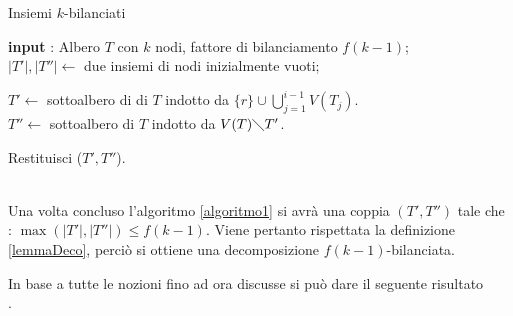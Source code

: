 \begin{algorithm}[H]
	\label{algoritmo1}
	\SetAlgoLined
	\caption{Insiemi $ k $-bilanciati}
	\textbf{input} : Albero $ T $ con $ k $ nodi, fattore di bilanciamento $ f(k-1) $;\\
	$ |T'| , |T''|\longleftarrow $ due insiemi di nodi inizialmente vuoti;\\ 	
	{
		{
			$ T'\longleftarrow $ sottoalbero di  di $ T $ indotto da $ \{r\} \cup \bigcup_{j=1}^{i-1}V(T_j)$.\\
			$ T''\longleftarrow $ sottoalbero di $ T $ indotto da $ V(T) \diagdown T'$.
		}
		 
}
	Restituisci ($ T',T'' $).

\end{algorithm}\mbox{}\\

Una volta concluso l'algoritmo \ref{algoritmo1} si avr\`a una coppia $ (T',T'') $ tale che : $ \max (|T'|,|T''|) \le f(k-1) $.
Viene pertanto rispettata la definizione \ref{lemmaDeco}, perci\`o si ottiene una decomposizione $ f(k-1) $-bilanciata.

In base a tutte le nozioni fino ad ora discusse si pu\`o dare il seguente risultato\mbox{}\\
.


